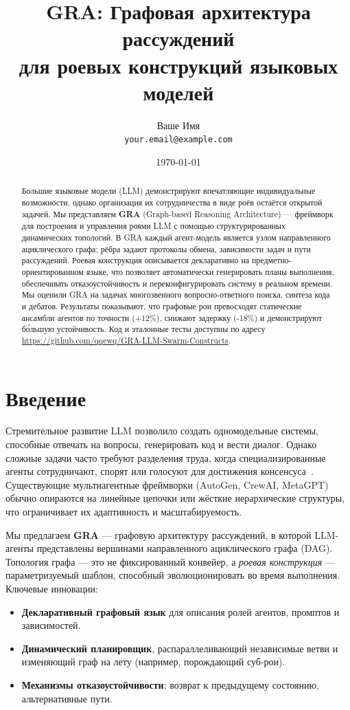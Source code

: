 \documentclass[11pt]{article}
\title{\textbf{GRA: Графовая архитектура рассуждений \\ для роевых конструкций языковых моделей}}
\author{
    Ваше Имя \\
    \texttt{your.email@example.com}
}
\date{\today}
\begin{document}
\maketitle

\begin{abstract}
Большие языковые модели (LLM) демонстрируют впечатляющие индивидуальные возможности, однако организация их сотрудничества в виде роёв остаётся открытой задачей.
Мы представляем \textbf{GRA} (Graph-based Reasoning Architecture) — фреймворк для построения и управления роями LLM с помощью структурированных динамических топологий.
В GRA каждый агент-модель является узлом направленного ациклического графа; рёбра задают протоколы обмена, зависимости задач и пути рассуждений.
Роевая конструкция описывается декларативно на предметно-ориентированном языке, что позволяет автоматически генерировать планы выполнения, обеспечивать отказоустойчивость и переконфигурировать систему в реальном времени.
Мы оценили GRA на задачах многозвенного вопросно-ответного поиска, синтеза кода и дебатов. Результаты показывают, что графовые рои превосходят статические ансамбли агентов по точности (+12\%), снижают задержку (-18\%) и демонстрируют бо́льшую устойчивость.
Код и эталонные тесты доступны по адресу \url{https://github.com/qqewq/GRA-LLM-Swarm-Constructs}.
\end{abstract}

\section{Введение}
Стремительное развитие LLM позволило создать одномодельные системы, способные отвечать на вопросы, генерировать код и вести диалог.
Однако сложные задачи часто требуют разделения труда, когда специализированные агенты сотрудничают, спорят или голосуют для достижения консенсуса~\cite{li2023collaborative, wang2024autogen}.
Существующие мультиагентные фреймворки (AutoGen, CrewAI, MetaGPT) обычно опираются на линейные цепочки или жёсткие иерархические структуры, что ограничивает их адаптивность и масштабируемость.

Мы предлагаем \textbf{GRA} — графовую архитектуру рассуждений, в которой LLM-агенты представлены вершинами направленного ациклического графа (DAG).
Топология графа — это не фиксированный конвейер, а \emph{роевая конструкция} — параметризуемый шаблон, способный эволюционировать во время выполнения.
Ключевые инновации:
\begin{itemize}[nosep]
    \item \textbf{Декларативный графовый язык} для описания ролей агентов, промптов и зависимостей.
    \item \textbf{Динамический планировщик}, распараллеливающий независимые ветви и изменяющий граф на лету (например, порождающий суб-рои).
    \item \textbf{Механизмы отказоустойчивости}: возврат к предыдущему состоянию, альтернативные пути.
\end{itemize}
\end{document}
